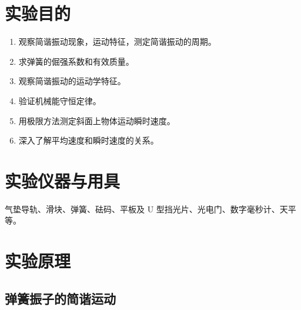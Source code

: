 \documentclass[UTF8]{article}
\theoremstyle{MyLineTheoremStyle} %
\theoremstyle{MyBlockTheoremStyle} %
\theoremstyle{MySubsubsectionStyle} %
\begin{document}

\newpage
{}





\section{实验目的}
\begin{enumerate}
    \item 观察简谐振动现象，运动特征，测定简谐振动的周期。
    \item 求弹簧的倔强系数和有效质量。
    \item 观察简谐振动的运动学特征。
    \item 验证机械能守恒定律。
    \item 用极限方法测定斜面上物体运动瞬时速度。
    \item 深入了解平均速度和瞬时速度的关系。
\end{enumerate}

\section{实验仪器与用具}
气垫导轨、滑块、弹簧、砝码、平板及 U 型挡光片、光电门、数字毫秒计、天平等。
\section{实验原理}

\subsection{弹簧振子的简谐运动}
\end{document}
